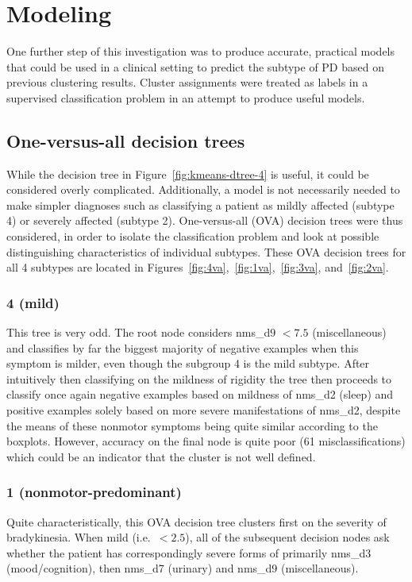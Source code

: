 \documentclass[letterpaper,12pt]{article}
\begin{document}
\section{Modeling}

One further step of this investigation was to produce accurate, practical
models that could be used in a clinical setting to predict the subtype of PD
based on previous clustering results. Cluster assignments were treated as
labels in a supervised classification problem in an attempt to produce useful
models.

\subsection{One-versus-all decision trees}
\label{sub:ova}

While the decision tree in Figure~\ref{fig:kmeans-dtree-4} is useful, it could
be considered overly complicated. Additionally, a model is not necessarily
needed to make simpler diagnoses such as classifying a patient as mildly
affected (subtype 4) or severely affected (subtype 2). One-versus-all (OVA)
decision trees were thus considered, in order to isolate the classification
problem and look at possible distinguishing characteristics of individual
subtypes. These OVA decision trees for all 4 subtypes are located in
Figures~\ref{fig:4va},~\ref{fig:1va},~\ref{fig:3va}, and~\ref{fig:2va}.

\subsubsection{4 (mild)}
This tree is very odd. The root node considers nms\_d9 $< 7.5$ (miscellaneous)
and classifies by far the biggest majority of negative examples when this
symptom is milder, even though the subgroup 4 is the mild subtype. After
intuitively then classifying on the mildness of rigidity the tree then proceeds
to classify once again negative examples based on mildness of nms\_d2 (sleep)
and positive examples solely based on more severe manifestations of nms\_d2,
despite the means of these nonmotor symptoms being quite similar according to
the boxplots.  However, accuracy on the final node is quite poor (61
misclassifications) which could be an indicator that the cluster is not well
defined.

\subsubsection{1 (nonmotor-predominant)}
Quite characteristically, this OVA decision tree clusters first on the severity
of bradykinesia. When mild (i.e.\ $< 2.5$), all of the subsequent decision
nodes ask whether the patient has correspondingly severe forms of primarily
nms\_d3 (mood/cognition), then nms\_d7 (urinary) and nms\_d9 (miscellaneous).
\end{document}
